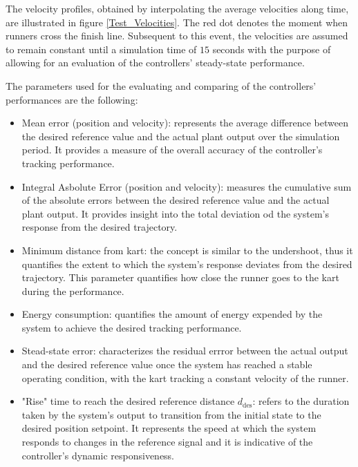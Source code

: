 \documentclass[a4paper,12pt,oneside]{book}
\begin{document}
The velocity profiles, obtained by interpolating the average velocities along time, are illustrated in figure \ref{Test_Velocities}.
The red dot denotes the moment when runners cross the finish line.
Subsequent to this event, the velocities are assumed to remain constant until a simulation time of $15$ seconds with the purpose of allowing for an evaluation of the controllers' steady-state performance.

The parameters used for the evaluating and comparing of the controllers' performances are the following:
\begin{itemize}
	\item Mean error (position and velocity): represents the average difference between the desired reference value and the actual plant output over the simulation period. It provides a measure of the overall accuracy of the controller's tracking performance.
	\item Integral Asbolute Error (position and velocity): measures the cumulative sum of the absolute errors between the desired reference value and the actual plant output. It provides insight into the total deviation od the system's response from the desired trajectory.
	\item Minimum distance from kart: the concept is similar to the undershoot, thus it quantifies the extent to which the system's response deviates from the desired trajectory. This parameter quantifies how close the runner goes to the kart during the performance.
	\item Energy consumption: quantifies the amount of energy expended by the system to achieve the desired tracking performance.
	\item Stead-state error: characterizes the residual errror between the actual output and the desired reference value once the system has reached a stable operating condition, with the kart tracking a constant velocity of the runner.
	\item "Rise" time to reach the desired reference distance $d_\text{des}$: refers to the duration taken by the system's output to transition from the initial state to the desired position setpoint. It represents the speed at which the system responds to changes in the reference signal and it is indicative of the controller's dynamic responsiveness.
\end{itemize}
\end{document}
